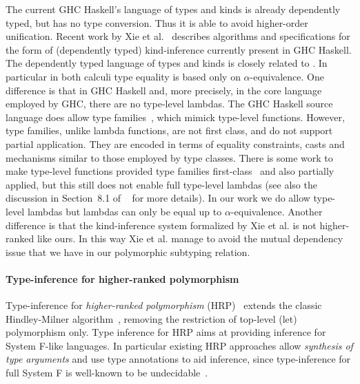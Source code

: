 The current GHC Haskell's language of types and kinds
is already dependently typed, but has no type conversion. Thus
it is able to avoid higher-order unification. Recent work by
Xie et al.~\citep{xie20kind} describes algorithms and specifications
for the form of (dependently typed) kind-inference currently present in GHC Haskell.
The dependently typed language of types and kinds is closely related
to \name. In particular in both calculi type equality is based only
on $\alpha$-equivalence. One difference is that in GHC Haskell and, more precisely,
in the core language employed by GHC, there
are no type-level lambdas. The GHC Haskell source language does allow
type families~\citep{assoctypes}, which mimick type-level functions. However,
type families, unlike lambda functions, are not first class, and do not support partial application.
They are encoded
in terms of equality constraints, casts and mechanisms similar to those
employed by type classes. There is some work to make type-level functions
provided type families first-class~\citep{kiss19higher} and also partially applied, but this
still does not enable full type-level lambdas (see also the discussion in Section~8.1
of ~\citep{kiss19higher} for more details).
In our work we do allow type-level lambdas
but lambdas can only be equal up to $\alpha$-equivalence.
Another difference is that the kind-inference system formalized by Xie et al.
is not higher-ranked like ours. In this way Xie et al. manage to avoid
the mutual dependency issue that we have in our polymorphic subtyping relation.

\paragraph{Type-inference for higher-ranked polymorphism}
Type-inference for \emph{higher-ranked polymorphism}
(HRP)~\citep{dunfield2013complete,le2003ml,leijen2008hmf,vytiniotis2008fph,jones2007practical,Serrano2018, odersky1996putting}
extends the classic Hindley-Milner algorithm~\citep{hindley1969principal,milner1978theory,damas1982principal},
removing the restriction of top-level (let) polymorphism only. Type
inference for HRP aims at providing inference for System F-like
languages. In particular existing HRP approaches allow \emph{synthesis of type arguments}
and use type annotations to aid
inference, since type-inference for full System F is
well-known to be undecidable~\citep{wells1999typability}.

